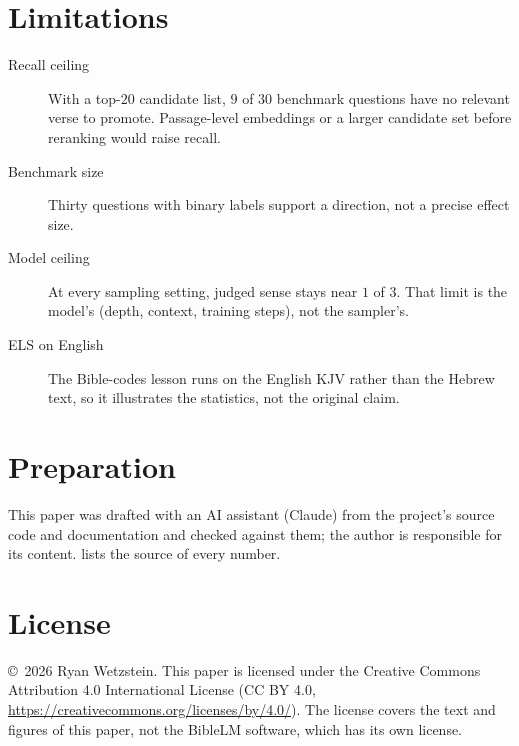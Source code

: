 \documentclass[11pt]{article}
\begin{document}
\section{Limitations}\label{sec:limits}

\begin{description}
  \item[Recall ceiling] With a top-$20$ candidate list, $9$ of $30$ benchmark
        questions have no relevant verse to promote. Passage-level embeddings or
        a larger candidate set before reranking would raise recall.
  \item[Benchmark size] Thirty questions with binary labels support a
        direction, not a precise effect size.
  \item[Model ceiling] At every sampling setting, judged sense stays near $1$
        of $3$. That limit is the model's (depth, context, training steps), not
        the sampler's.
  \item[ELS on English] The Bible-codes lesson runs on the English KJV rather
        than the Hebrew text, so it illustrates the statistics, not the
        original claim.
\end{description}

\section*{Preparation}

This paper was drafted with an AI assistant (Claude) from the project's source
code and documentation and checked against them; the author is responsible for
its content.  lists the source of every number.

\section*{License}

\copyright\ 2026 Ryan Wetzstein. This paper is licensed under the Creative
Commons Attribution 4.0 International License (CC BY 4.0,
\url{https://creativecommons.org/licenses/by/4.0/}). The license covers the
text and figures of this paper, not the BibleLM software, which has its own
license.
\end{document}
